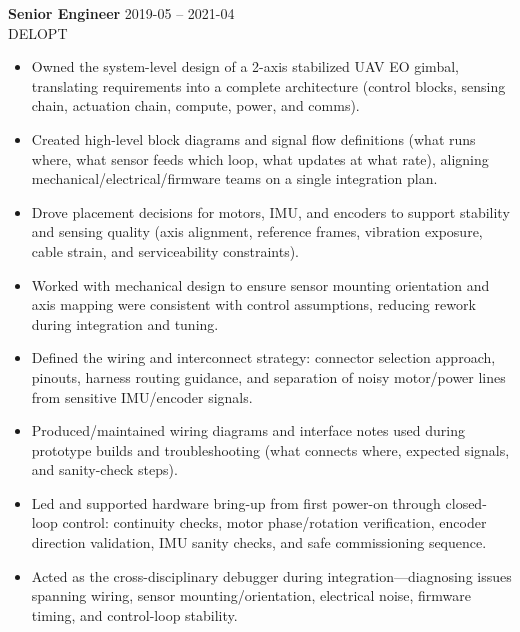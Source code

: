 \documentclass[11pt]{article}
\begin{document}
\vspace{4pt}

\textbf{ Senior Engineer } \hfill 2019-05 -- 2021-04\\
DELOPT \\

\begin{itemize}[leftmargin=*,noitemsep]
  
  \item Owned the system-level design of a 2-axis stabilized UAV EO gimbal, translating requirements into a complete architecture (control blocks, sensing chain, actuation chain, compute, power, and comms).
  
  \item Created high-level block diagrams and signal flow definitions (what runs where, what sensor feeds which loop, what updates at what rate), aligning mechanical/electrical/firmware teams on a single integration plan.
  
  \item Drove placement decisions for motors, IMU, and encoders to support stability and sensing quality (axis alignment, reference frames, vibration exposure, cable strain, and serviceability constraints).
  
  \item Worked with mechanical design to ensure sensor mounting orientation and axis mapping were consistent with control assumptions, reducing rework during integration and tuning.
  
  \item Defined the wiring and interconnect strategy: connector selection approach, pinouts, harness routing guidance, and separation of noisy motor/power lines from sensitive IMU/encoder signals.
  
  \item Produced/maintained wiring diagrams and interface notes used during prototype builds and troubleshooting (what connects where, expected signals, and sanity-check steps).
  
  \item Led and supported hardware bring-up from first power-on through closed-loop control: continuity checks, motor phase/rotation verification, encoder direction validation, IMU sanity checks, and safe commissioning sequence.
  
  \item Acted as the cross-disciplinary debugger during integration—diagnosing issues spanning wiring, sensor mounting/orientation, electrical noise, firmware timing, and control-loop stability.
  

\end{itemize}
\end{document}
